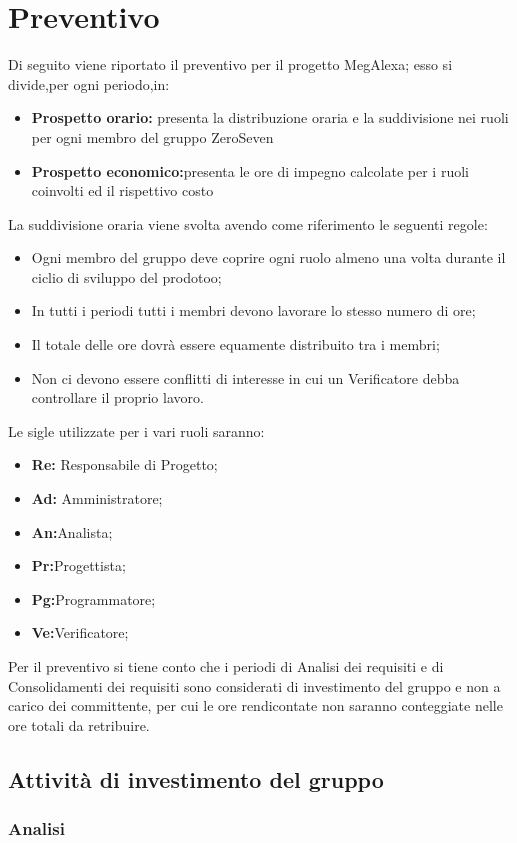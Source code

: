 \chapter{Preventivo}
Di seguito viene riportato il preventivo per il progetto MegAlexa; esso si divide,per ogni periodo,in:
\begin{itemize}
	\item \textbf{Prospetto orario:} presenta la distribuzione oraria e la suddivisione nei ruoli per ogni membro del gruppo ZeroSeven
	\item \textbf{Prospetto economico:}presenta le ore di impegno calcolate per i ruoli coinvolti ed il rispettivo costo 
\end{itemize}
La suddivisione oraria viene svolta avendo come riferimento le seguenti regole:
\begin{itemize}
	\item Ogni membro del gruppo deve coprire ogni ruolo almeno una volta durante il ciclio di sviluppo del prodotoo;
	\item In tutti i periodi tutti i membri devono lavorare lo stesso numero di ore;
	\item Il totale delle ore dovrà essere equamente distribuito tra i membri;
	\item Non ci devono essere conflitti di interesse in cui un Verificatore debba controllare il proprio lavoro.
\end{itemize}
Le sigle utilizzate per i vari ruoli saranno:
\begin{itemize}
	\item \textbf{Re:} Responsabile di Progetto;
	\item \textbf{Ad:} Amministratore;
	\item \textbf{An:}Analista;
	\item \textbf{Pr:}Progettista;
	\item \textbf{Pg:}Programmatore;
	\item \textbf{Ve:}Verificatore;
\end{itemize}

Per il preventivo si tiene conto che i periodi di Analisi dei requisiti e di Consolidamenti dei requisiti sono considerati di investimento del gruppo e  non a carico dei committente, per cui  le ore rendicontate non saranno conteggiate nelle ore totali da retribuire.
\newpage
\section{Attività di  investimento del gruppo}
\subsection{Analisi}
